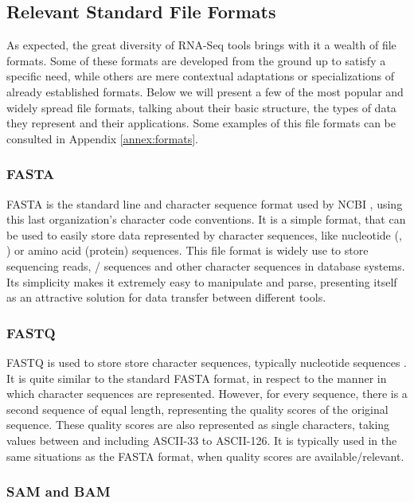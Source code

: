 \subsection{Relevant Standard File Formats}\label{sec:formats}

As expected, the great diversity of RNA-Seq tools brings with it a wealth of
file formats. Some of these formats are developed from the ground up to satisfy
a specific need, while others are mere contextual adaptations or specializations
of already established formats. Below we will present a few of the most popular
and widely spread file formats, talking about their basic structure, the types
of data they represent and their applications. Some examples of this file
formats can be consulted in Appendix \ref{annex:formats}.

\subsubsection*{FASTA}

FASTA is the standard line and character sequence format used by NCBI
\cite{ncbi:fasta}, using this last organization's character code conventions. It
is a simple format, that can be used to easily store data represented by
character sequences, like nucleotide (\dna, \rna) or amino acid (protein)
sequences. This file format is widely use to store sequencing reads, \dna/\rna{}
sequences and other character sequences in database systems. Its simplicity
makes it extremely easy to manipulate and parse, presenting itself as an
attractive solution for data transfer between different tools.

\subsubsection*{FASTQ}

FASTQ is used to store store character sequences, typically nucleotide sequences
\cite{Cock2010}. It is quite similar to the standard FASTA format, in respect to
the manner in which character sequences are represented. However, for every
sequence, there is a second sequence of equal length, representing the quality
scores of the original sequence. These quality scores are also represented as
single characters, taking values between and including ASCII-33 to ASCII-126.
It is typically used in the same situations as the FASTA format, when quality
scores are available/relevant.

\subsubsection*{SAM and BAM}

